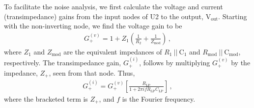 \documentclass[aip,rsi,reprint]{revtex4-1} %
\begin{document}
To facilitate the noise analysis, we first calculate the voltage and current (transimpedance) gains from the input nodes of U2 to the output, $\text{V}_\text{out}$.
Starting with the non-inverting node, we find the voltage gain to be
\begin{align}
G_{+}^{(v)} = 1 + Z_1\left(\frac{1}{R_2} + \frac{1}{Z_\text{mod}}\right)\,,
\end{align}
where $Z_1$ and $Z_\text{mod}$ are the equivalent impedances of $R_1~||~\text{C}_1$ and $R_\text{mod}~||~\text{C}_\text{mod}$, respectively.
The transimpedance gain, $G^{(i)}_{+}$, follows by multiplying $G_+^{(v)}$ by the impedance, $Z_+$, seen from that node. %
Thus,
\begin{align}
G_{+}^{(i)} = G_{+}^{(v)}\left[\frac{R_\text{LP}}{1+2\pi i f R_\text{LP} C_\text{LP}}\right]\,,
\end{align}
where the bracketed term is $Z_+$, and $f$ is the Fourier frequency.
\end{document}
